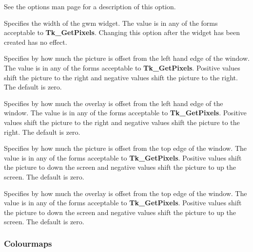\begin{rquote}
See the options man page for a description of this option.
\end{rquote}

\begin{rquote}
Specifies the width of the gwm widget. The value is in any of the forms
acceptable to {\bf Tk\_GetPixels}. Changing this option after the widget
has been created has no effect.
\end{rquote}

\begin{rquote}
Specifies by how much the picture is offset from the left hand edge of the
window. The value is in any of the forms acceptable to {\bf Tk\_GetPixels}.
Positive values shift the picture to the right and negative values shift the
picture to the right. The default is zero.
\end{rquote}

\begin{rquote}
Specifies by how much the overlay is offset from the left hand edge of the
window. The value is in any of the forms acceptable to {\bf Tk\_GetPixels}.
Positive values shift the picture to the right and negative values shift the
picture to the right. The default is zero.
\end{rquote}

\begin{rquote}
Specifies by how much the picture is offset from the top edge of the
window. The value is in any of the forms acceptable to {\bf Tk\_GetPixels}.
Positive values shift the picture to down the screen and negative values
shift the picture to up the screen. The default is zero.
\end{rquote}

\begin{rquote}
Specifies by how much the overlay is offset from the top edge of the
window. The value is in any of the forms acceptable to {\bf Tk\_GetPixels}.
Positive values shift the picture to down the screen and negative values
shift the picture to up the screen. The default is zero.
\end{rquote}

\subsubsection{Colourmaps}

